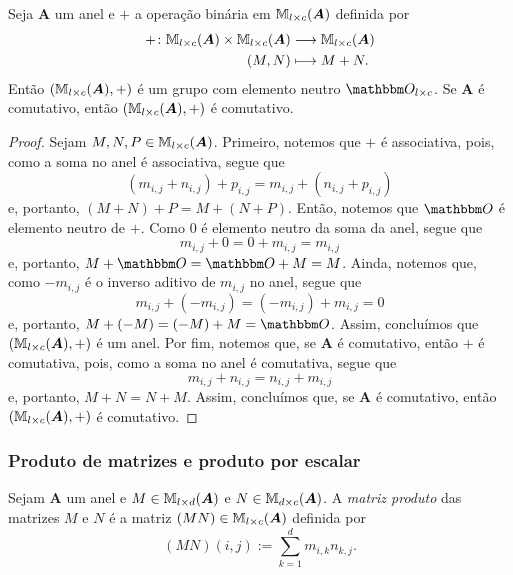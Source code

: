 \begin{proposition}
	Seja $\bm A$ um anel e $+$ a operação binária em $\mathbb{M}_{l \times c}(\bm A)$ definida por
	\begin{align*}
	{+}\colon {\mathbb{M}_{l \times c}(\bm A) \times \mathbb{M}_{l \times c}(\bm A)} &\longrightarrow {\mathbb{M}_{l \times c}(\bm A)} \\{(M,N)} &\longmapsto M+N.
	\end{align*}
Então $(\mathbb{M}_{l \times c}(\bm A),+)$ é um grupo com elemento neutro $\zero_{l \times c}$. Se $\bm A$ é comutativo, então $(\mathbb{M}_{l \times c}(\bm A),+)$ é comutativo.
\end{proposition}
\begin{proof}
	Sejam $M,N,P \in \mathbb{M}_{l \times c}(\bm A)$. Primeiro, notemos que $+$ é associativa, pois, como a soma no anel é associativa, segue que
	\begin{equation*}
	(m_{i,j}+n_{i,j})+p_{i,j} = m_{i,j}+(n_{i,j}+p_{i,j})
	\end{equation*}
e, portanto, $(M+N)+P=M+(N+P)$. Então, notemos que $\zero$ é elemento neutro de $+$. Como $0$ é elemento neutro da soma da anel, segue que
	\begin{equation*}
	m_{i,j}+0 = 0+m_{i,j} = m_{i,j}
	\end{equation*}
e, portanto, $M+\zero=\zero+M=M$. Ainda, notemos que, como $-m_{i,j}$ é o inverso aditivo de $m_{i,j}$ no anel, segue que
	\begin{equation*}
	m_{i,j}+(-m_{i,j}) = (-m_{i,j})+m_{i,j} = 0
	\end{equation*}
e, portanto, $M+(-M)=(-M)+M=\zero$.	Assim, concluímos que $(\mathbb{M}_{l \times c}(\bm A),+)$ é um anel. Por fim, notemos que, se $\bm A$ é comutativo, então $+$ é comutativa, pois, como a soma no anel é comutativa, segue que
	\begin{equation*}
	m_{i,j}+n_{i,j} = n_{i,j}+m_{i,j}
	\end{equation*}
e, portanto, $M+N=N+M$. Assim, concluímos que, se $\bm A$ é comutativo, então $(\mathbb{M}_{l \times c}(\bm A),+)$ é comutativo.
\end{proof}

\subsubsection{Produto de matrizes e produto por escalar}

\begin{definition}
	Sejam $\bm A$ um anel e $M \in \mathbb{M}_{l \times d}(\bm A)$ e $N \in \mathbb{M}_{d \times c}(\bm A)$. A \emph{matriz produto} das matrizes $M$ e $N$ é a matriz $(MN) \in \mathbb{M}_{l \times c}(\bm A)$ definida por
	\begin{equation*}
	(MN)(i,j) := \sum_{k=1}^d m_{i,k}n_{k,j}.
	\end{equation*}
\end{definition}

